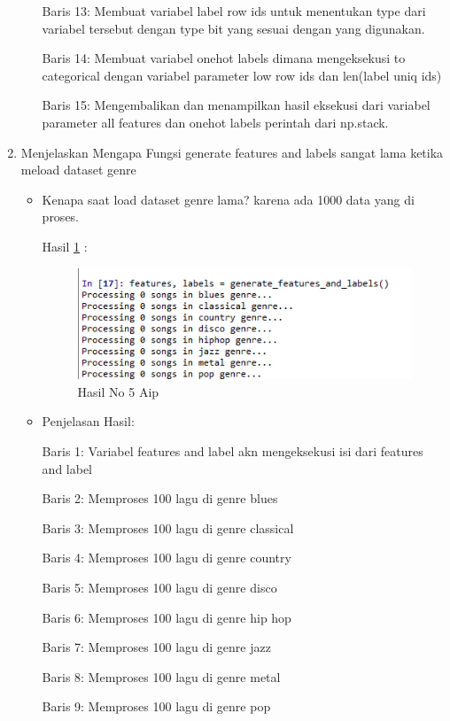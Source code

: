 \begin{enumerate}
\begin{itemize}
\par Baris 13: Membuat variabel label row ids untuk menentukan type dari variabel tersebut dengan type bit yang sesuai dengan yang digunakan.
\par Baris 14: Membuat variabel onehot labels dimana mengeksekusi to categorical dengan variabel parameter low row ids dan len(label uniq ids)
\par Baris 15: Mengembalikan dan menampilkan hasil eksekusi dari variabel parameter all features dan onehot labels perintah dari np.stack.
\end{itemize}
\par
\par
\item Menjelaskan Mengapa Fungsi generate features and labels sangat lama ketika meload dataset genre
\begin{itemize}
\item Kenapa saat load dataset genre lama? karena ada 1000 data yang di proses.

\par Hasil \ref{no5Aip} :
\begin{figure}[!hbtp]
\centering
\includegraphics[scale=0.7]{figures/AIP/no5aip.PNG}
\caption{Hasil No 5 Aip}
\label{no5Aip}
\end{figure}
\item Penjelasan Hasil:
\par Baris 1: Variabel features and label akn mengeksekusi isi dari features and label
\par Baris 2: Memproses 100 lagu di genre blues
\par Baris 3: Memproses 100 lagu di  genre classical
\par Baris 4: Memproses 100 lagu di  genre country
\par Baris 5: Memproses 100 lagu di  genre disco
\par Baris 6: Memproses 100 lagu di  genre  hip hop
\par Baris 7: Memproses 100 lagu di  genre jazz
\par Baris 8: Memproses 100 lagu di  genre metal
\par Baris 9: Memproses 100 lagu di genre pop

\end{itemize}
\end{enumerate}
